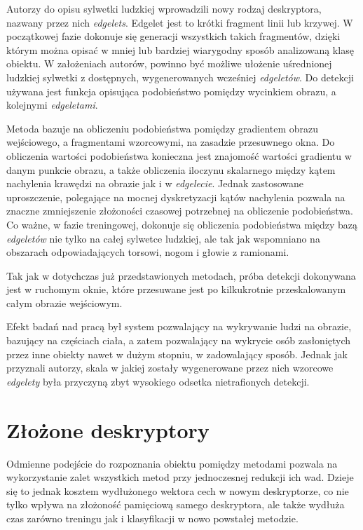 Autorzy do opisu sylwetki ludzkiej wprowadzili nowy rodzaj deskryptora, nazwany przez nich \textit{edgelets}. Edgelet jest to krótki fragment linii lub krzywej. W początkowej fazie dokonuje się generacji wszystkich takich fragmentów, dzięki którym można opisać w mniej lub bardziej wiarygodny sposób analizowaną klasę obiektu. W założeniach autorów, powinno być możliwe ułożenie uśrednionej ludzkiej sylwetki z dostępnych, wygenerowanych wcześniej \textit{edgeletów}.
Do detekcji używana jest funkcja opisująca podobieństwo pomiędzy wycinkiem obrazu, a kolejnymi \textit{edgeletami}.

Metoda bazuje na obliczeniu podobieństwa pomiędzy gradientem obrazu wejściowego, a fragmentami wzorcowymi, na zasadzie przesuwnego okna. Do obliczenia wartości podobieństwa konieczna jest znajomość wartości gradientu w danym punkcie obrazu, a także obliczenia iloczynu skalarnego między kątem nachylenia krawędzi na obrazie jak i w \textit{edgelecie}. Jednak zastosowane uproszczenie, polegające na mocnej dyskretyzacji kątów nachylenia pozwala na znaczne zmniejszenie złożoności czasowej potrzebnej na obliczenie podobieństwa.
Co ważne, w fazie treningowej, dokonuje się obliczenia podobieństwa między bazą \textit{edgeletów} nie tylko na całej sylwetce ludzkiej, ale tak jak wspomniano na obszarach odpowiadających torsowi, nogom i głowie z ramionami.

Tak jak w dotychczas już przedstawionych metodach, próba detekcji dokonywana jest w ruchomym oknie, które przesuwane jest po kilkukrotnie przeskalowanym całym obrazie wejściowym.

Efekt badań nad pracą \cite{Wu05} był system pozwalający na wykrywanie ludzi na obrazie, bazujący na częściach ciała, a zatem pozwalający na wykrycie osób zasłoniętych przez inne obiekty nawet w dużym stopniu, w zadowalający sposób.
Jednak jak przyznali autorzy, skala w jakiej zostały wygenerowane przez nich wzorcowe \textit{edgelety} była przyczyną zbyt wysokiego odsetka nietrafionych detekcji.


\section{Złożone deskryptory}
\label{sec:zlozoneDeskryptory}

Odmienne podejście do rozpoznania obiektu pomiędzy metodami pozwala na wykorzystanie zalet wszystkich metod przy jednoczesnej redukcji ich wad. Dzieje się to jednak kosztem wydłużonego wektora cech w nowym deskryptorze, co nie tylko wpływa na złożoność pamięciową samego deskryptora, ale także wydłuża czas zarówno treningu jak i klasyfikacji w nowo powstałej metodzie.

